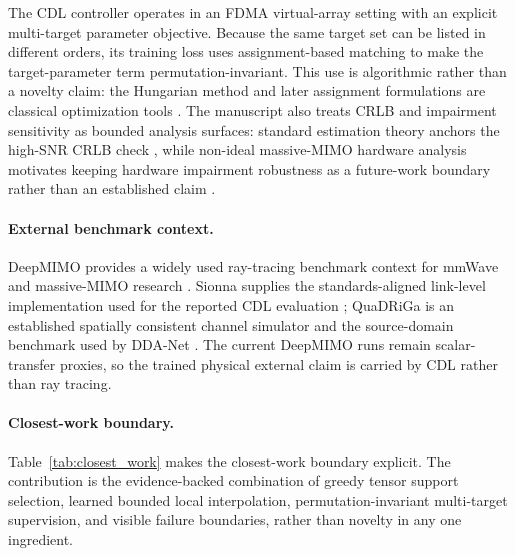 The CDL controller operates in an FDMA virtual-array setting with an explicit multi-target parameter objective. Because the same target set can be listed in different orders, its training loss uses assignment-based matching to make the target-parameter term permutation-invariant. This use is algorithmic rather than a novelty claim: the Hungarian method and later assignment formulations are classical optimization tools \cite{kuhn1955hungarian,munkres1957assignment}. The manuscript also treats CRLB and impairment sensitivity as bounded analysis surfaces: standard estimation theory anchors the high-SNR CRLB check \cite{kay1993fundamentals}, while non-ideal massive-MIMO hardware analysis motivates keeping hardware impairment robustness as a future-work boundary rather than an established claim \cite{bjornson2014nonideal}.

\paragraph{External benchmark context.}
DeepMIMO provides a widely used ray-tracing benchmark context for mmWave and massive-MIMO research \cite{alkhateeb2019deepmimo,deepmimo2026toolchain}. Sionna supplies the standards-aligned link-level implementation used for the reported CDL evaluation \cite{hoydis2023sionna,3gpp38901}; QuaDRiGa is an established spatially consistent channel simulator and the source-domain benchmark used by DDA-Net \cite{jaeckel2014quadriga,ma2026ddanet}. The current DeepMIMO runs remain scalar-transfer proxies, so the trained physical external claim is carried by CDL rather than ray tracing.

\paragraph{Closest-work boundary.}
Table~\ref{tab:closest_work} makes the closest-work boundary explicit. The contribution is the evidence-backed combination of greedy tensor support selection, learned bounded local interpolation, permutation-invariant multi-target supervision, and visible failure boundaries, rather than novelty in any one ingredient.

